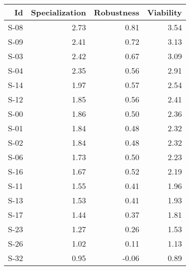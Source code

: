 

\begin{tabular}{ | r | r | r | r | }
    \hline
                    Id  &  Specialization  &      Robustness  &       Viability  \\
    \hline
    \hline
                  S-08  &            2.73  &            0.81  &            3.54  \\
    \hline
                  S-09  &            2.41  &            0.72  &            3.13  \\
    \hline
                  S-03  &            2.42  &            0.67  &            3.09  \\
    \hline
                  S-04  &            2.35  &            0.56  &            2.91  \\
    \hline
                  S-14  &            1.97  &            0.57  &            2.54  \\
    \hline
                  S-12  &            1.85  &            0.56  &            2.41  \\
    \hline
                  S-00  &            1.86  &            0.50  &            2.36  \\
    \hline
                  S-01  &            1.84  &            0.48  &            2.32  \\
    \hline
                  S-02  &            1.84  &            0.48  &            2.32  \\
    \hline
                  S-06  &            1.73  &            0.50  &            2.23  \\
    \hline
                  S-16  &            1.67  &            0.52  &            2.19  \\
    \hline
                  S-11  &            1.55  &            0.41  &            1.96  \\
    \hline
                  S-13  &            1.53  &            0.41  &            1.93  \\
    \hline
                  S-17  &            1.44  &            0.37  &            1.81  \\
    \hline
                  S-23  &            1.27  &            0.26  &            1.53  \\
    \hline
                  S-26  &            1.02  &            0.11  &            1.13  \\
    \hline
                  S-32  &            0.95  &           -0.06  &            0.89  \\

\end{tabular}

